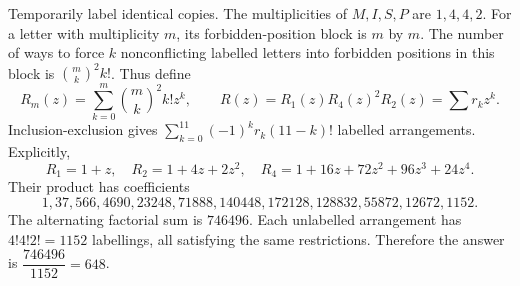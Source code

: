 Temporarily label identical copies. The multiplicities of $M,I,S,P$ are $1,4,4,2$. For a letter with multiplicity $m$, its forbidden-position block is $m$ by $m$. The number of ways to force $k$ nonconflicting labelled letters into forbidden positions in this block is $\binom mk^2k!$. Thus define
\[
R_m(z)=\sum_{k=0}^m\binom mk^2k!z^k,\qquad
R(z)=R_1(z)R_4(z)^2R_2(z)=\sum r_kz^k.
\]
Inclusion-exclusion gives $\sum_{k=0}^{11}(-1)^kr_k(11-k)!$ labelled arrangements. Explicitly,
\[
R_1=1+z,\quad R_2=1+4z+2z^2,\quad
R_4=1+16z+72z^2+96z^3+24z^4.
\]
Their product has coefficients
\[
1,37,566,4690,23248,71888,140448,172128,
128832,55872,12672,1152.
\]
The alternating factorial sum is $746496$. Each unlabelled arrangement has $4!4!2!=1152$ labellings, all satisfying the same restrictions. Therefore the answer is $\boxed{\dfrac{746496}{1152}=648}$.
